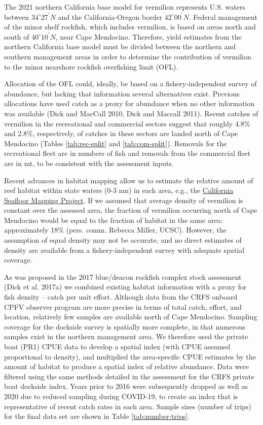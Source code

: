 \documentclass[
  english,
  a4paper,
]{article}
\begin{document}
The 2021 northern California base model for vermilion represents U.S.
waters between $34^\circ 27^\prime N$ and the California-Oregon border $42^\circ 00^\prime N$. Federal management of
the minor shelf rockfish, which includes vermilion, is based on areas north and south of $40^\circ 10^\prime N$,
near Cape Mendocino. Therefore, yield estimates from the northern California base
model must be divided between the northern and southern management areas in order
to determine the contribution of vermilion to the minor nearshore rockfish overfishing limit (OFL).

Allocation of the OFL could, ideally, be based on a fishery-independent survey of
abundance, but lacking that information several alternatives exist. Previous
allocations have used catch as a proxy for abundance when no other information
was available (Dick and MacCall 2010, Dick and Maccall 2011). Recent catches of vermilion in the recreational
and commercial sectors suggest that roughly 4.8\% and 2.8\%, respectively, of catches
in these sectors are landed north of Cape Mendocino (Tables \ref{tab:rec-split} and \ref{tab:com-split}). Removals for the recreational fleet are in numbers of fish and removals
from the commercial fleet are in mt, to be consistent with the assessment inputs.

Recent advances in habitat mapping allow us to estimate the relative amount of reef
habitat within state waters (0-3 nm) in each area, e.g., the \href{https://walrus.wr.usgs.gov/mapping/csmp/}{California Seafloor Mapping Project}.
If we assumed that average density of vermilion is constant over the assessed area,
the fraction of vermilion occurring north of Cape Mendocino would be equal to the
fraction of habitat in the same area: approximately 18\% (pers. comm. Rebecca Miller, UCSC). However, the assumption of equal density may not be accurate, and no direct estimates of
density are available from a fishery-independent survey with adequate spatial coverage.

As was proposed in the 2017 blue/deacon rockfish complex stock assessment (Dick et al. 2017a) we combined existing habitat information with a proxy for fish density -- catch per unit effort. Although data from the CRFS onboard CPFV observer
program are more precise in terms of total catch, effort, and location, relatively few
samples are available north of Cape Mendocino. Sampling coverage for the dockside
survey is spatially more complete, in that numerous samples exist in the northern
management area. We therefore used the private boat (PR1) CPUE data to develop a spatial
index (with CPUE assumed proportional to density), and multiplied the area-specific
CPUE estimates by the amount of habitat to produce a spatial index of relative abundance.
Data were filtered using the same methods detailed in the assessment for the CRFS
private boat dockside index. Years prior to 2016 were subsequently dropped as well as 2020 due to reduced sampling during COVID-19, to create an index that is representative of recent catch rates in each area. Sample sizes (number of trips) for the final data set are shown in Table \ref{tab:number-trips}.
\end{document}
